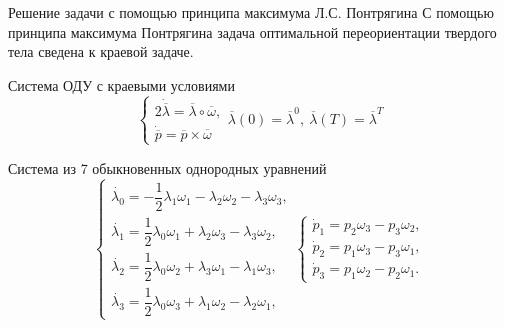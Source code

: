 \documentclass[10pt,utf8,presentation,notheorems,xcolor=dvipsnames,compress]{beamer}
\begin{document}
\begin{frame}[t]{Решение задачи с помощью принципа максимума Л.С. Понтрягина}
С помощью принципа максимума Понтрягина задача оптимальной переориентации твердого тела сведена к краевой задаче.
\begin{block}{Система ОДУ с краевыми условиями}
\begin{equation}
\begin{cases}
	2\dot{\overline{\lambda}} = \overline{\lambda} \circ \overline{\omega},\\
	\dot{\overline{\textit{p}}} = \overline{\textit{p}} \times \overline{\omega}
\end{cases}
\overline{\lambda}(0) = \overline{\lambda}^{0},\ \overline{\lambda}(\textit{T}) = \overline{\lambda}^{\textit{T}}
\end{equation}
\end{block}

\begin{block}{Система из 7 обыкновенных однородных уравнений}
\begin{equation}
\begin{cases}
\dot{\lambda_{0}} = -\dfrac{1}{2} \lambda_{1}\omega_{1} - \lambda_{2}\omega_{2} - \lambda_{3}\omega_{3},\\
\dot{\lambda_{1}} = \dfrac{1}{2} \lambda_{0}\omega_{1} + \lambda_{2}\omega_{3} - \lambda_{3}\omega_{2},\\
\dot{\lambda_{2}} = \dfrac{1}{2} \lambda_{0}\omega_{2} + \lambda_{3}\omega_{1} - \lambda_{1}\omega_{3},\\
\dot{\lambda_{3}} = \dfrac{1}{2} \lambda_{0}\omega_{3} + \lambda_{1}\omega_{2} - \lambda_{2}\omega_{1},
\end{cases}
\begin{cases}
\dot{\textit{p}}_1 = \textit{p}_2 \omega_3 - \textit{p}_3 \omega_2,\\
\dot{\textit{p}}_2 = \textit{p}_1 \omega_3 - \textit{p}_3 \omega_1,\\
\dot{\textit{p}}_3 = \textit{p}_1 \omega_2 - \textit{p}_2 \omega_1.
\end{cases}
\end{equation}
\end{block}
\end{frame}
\end{document}
